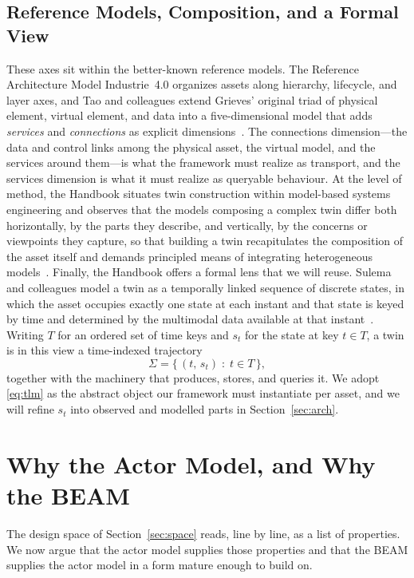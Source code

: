 \documentclass[conference]{IEEEtran}
\newcommand{\beam}{BEAM\xspace}
\begin{document}
\subsection{Reference Models, Composition, and a Formal View}
These axes sit within the better-known reference models. The Reference
Architecture Model Industrie~4.0 organizes assets along hierarchy, lifecycle,
and layer axes, and Tao and colleagues extend Grieves' original triad of
physical element, virtual element, and data into a five-dimensional model that
adds \emph{services} and \emph{connections} as explicit
dimensions~\cite{hamzaoui2024,tao2019}. The connections dimension---the data
and control links among the physical asset, the virtual model, and the
services around them---is what the framework must realize as transport, and the
services dimension is what it must realize as queryable behaviour. At the level
of method, the Handbook situates twin construction within model-based systems
engineering and observes that the models composing a complex twin differ both
horizontally, by the parts they describe, and vertically, by the concerns or
viewpoints they capture, so that building a twin recapitulates the composition
of the asset itself and demands principled means of integrating heterogeneous
models~\cite{kovalyov2024}. Finally, the Handbook offers a formal lens that we
will reuse. Sulema and colleagues model a twin as a temporally linked sequence
of discrete states, in which the asset occupies exactly one state at each
instant and that state is keyed by time and determined by the multimodal data
available at that instant~\cite{sulema2024}. Writing $T$ for an ordered set of
time keys and $s_t$ for the state at key $t \in T$, a twin is in this view a
time-indexed trajectory
\begin{equation}
\label{eq:tlm}
\Sigma = \{\, (t,\, s_t) \;:\; t \in T \,\},
\end{equation}
together with the machinery that produces, stores, and queries it. We adopt
\eqref{eq:tlm} as the abstract object our framework must instantiate per asset,
and we will refine $s_t$ into observed and modelled parts in
Section~\ref{sec:arch}.

\section{Why the Actor Model, and Why the \beam}
\label{sec:why}
The design space of Section~\ref{sec:space} reads, line by line, as a list of
properties. We now argue that the actor model supplies those properties and
that the \beam supplies the actor model in a form mature enough to build on.
\end{document}
